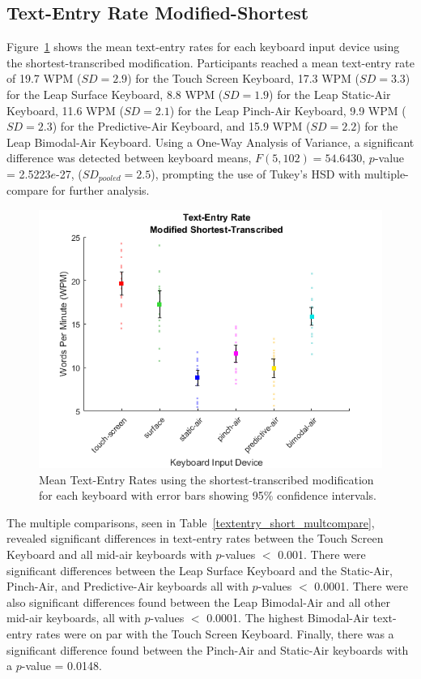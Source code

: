 \subsection{Text-Entry Rate Modified-Shortest}
Figure~\ref{fig_textentry_short_mean} shows the mean text-entry rates for each keyboard input device using the shortest-transcribed modification. Participants reached a mean text-entry rate of 19.7 WPM ($SD = 2.9$) for the Touch Screen Keyboard, 17.3 WPM ($SD = 3.3$) for the Leap Surface Keyboard, 8.8 WPM ($SD = 1.9$) for the Leap Static-Air Keyboard, 11.6 WPM ($SD = 2.1$) for the Leap Pinch-Air Keyboard, 9.9 WPM ($SD = 2.3$) for the Predictive-Air Keyboard, and 15.9 WPM ($SD = 2.2$) for the Leap Bimodal-Air Keyboard. Using a One-Way Analysis of Variance, a significant difference was detected between keyboard means, $F(5, 102) = 54.6430$, $p$-value = 2.5223$e$-27, ($SD_{pooled} = 2.5$), prompting the use of Tukey's HSD with multiple-compare for further analysis.

\begin{figure}[h]
	\centering
	\includegraphics{fig_textentry_short_mean}
	\caption[Mean Text-Entry Rates for Modified-Shortest]{Mean Text-Entry Rates using the shortest-transcribed modification for each keyboard with error bars showing 95\% confidence intervals.}
	\label{fig_textentry_short_mean}
\end{figure}

The multiple comparisons, seen in Table~\ref{textentry_short_multcompare}, revealed significant differences in text-entry rates between the Touch Screen Keyboard and all mid-air keyboards with $p$-values $<$ 0.001. There were significant differences between the Leap Surface Keyboard and the Static-Air, Pinch-Air, and Predictive-Air keyboards all with $p$-values $<$ 0.0001. There were also significant differences found between the Leap Bimodal-Air and all other mid-air keyboards, all with $p$-values $<$ 0.0001. The highest Bimodal-Air text-entry rates were on par with the Touch Screen Keyboard. Finally, there was a significant difference found between the Pinch-Air and Static-Air keyboards with a $p$-value = 0.0148.

